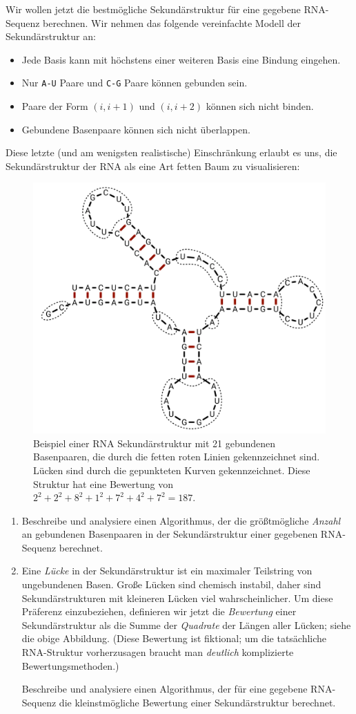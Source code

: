 \documentclass{uebung_cs}
\begin{document}
Wir wollen jetzt die bestmögliche Sekundärstruktur für eine gegebene RNA-Sequenz berechnen. Wir nehmen das folgende vereinfachte Modell der Sekundärstruktur an:
\begin{itemize}
    \item Jede Basis kann mit höchstens einer weiteren Basis eine Bindung eingehen.
    \item Nur \verb|A-U| Paare und \verb|C-G| Paare können gebunden sein.
    \item Paare der Form $(i,i+1)$ und $(i,i+2)$ können sich nicht binden.
    \item Gebundene Basenpaare können sich nicht überlappen.
\end{itemize}
Diese letzte (und am wenigsten realistische) Einschränkung erlaubt es uns, die Sekundärstruktur der RNA als eine Art fetten Baum zu visualisieren:
\begin{figure}[hp]
    \begin{center}
        \includegraphics[width=.5\textwidth]{RNA-secondary-structure.png}
    \end{center}
\caption{Beispiel einer RNA Sekundärstruktur mit 21 gebundenen Basenpaaren, die durch die fetten roten Linien gekennzeichnet sind. Lücken sind durch die gepunkteten Kurven gekennzeichnet. Diese Struktur hat eine Bewertung von $2^2+2^2+8^2+1^2+7^2+4^2+7^2=187$.}
\end{figure}
\begin{enumerate}
    \item Beschreibe und analysiere einen Algorithmus, der die größtmögliche \emph{Anzahl} an gebundenen Basenpaaren in der Sekundärstruktur einer gegebenen RNA-Sequenz berechnet.
    \item Eine \emph{Lücke} in der Sekundärstruktur ist ein maximaler Teilstring von ungebundenen Basen. Große Lücken sind chemisch instabil, daher sind Sekundärstrukturen mit kleineren Lücken viel wahrscheinlicher.
    Um diese Präferenz einzubeziehen, definieren wir jetzt die \emph{Bewertung} einer Sekundärstruktur als die Summe der \emph{Quadrate} der Längen aller Lücken; siehe die obige Abbildung. (Diese Bewertung ist fiktional; um die tatsächliche RNA-Struktur vorherzusagen braucht man \emph{deutlich} komplizierte Bewertungsmethoden.)

    Beschreibe und analysiere einen Algorithmus, der für eine gegebene RNA-Sequenz die kleinstmögliche Bewertung einer Sekundärstruktur berechnet.
\end{enumerate}
\end{document}
